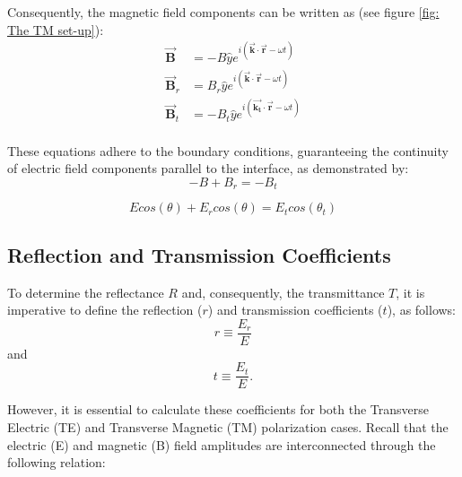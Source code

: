 Consequently, the magnetic field components can be written as (see figure \ref{fig: The TM set-up}):
\begin{align*}
    \vec{\mathbf{B}} &= -B\hat{y} e^{i(\vec{\mathbf{k}} \cdot \vec{\mathbf{r}} - \omega t)} \\
    \vec{\mathbf{B}}_r &= B_r\hat{y} e^{i(\vec{\mathbf{k}} \cdot \vec{\mathbf{r}} - \omega t)} \\
    \vec{\mathbf{B}}_t &= -B_t\hat{y} e^{i(\vec{\mathbf{k_t}} \cdot \vec{\mathbf{r}} - \omega t)} \\
\end{align*}

These equations adhere to the boundary conditions, guaranteeing the continuity of electric field components parallel to the interface, as demonstrated by:
\begin{equation} \label{Magnetic field boundary conditions for TM waves}
-B + B_r = -B_t
\end{equation}

\begin{equation} \label{Electric field boundary conditions for TM waves}
Ecos(\theta) + E_rcos(\theta) = E_tcos(\theta_t)
\end{equation}

\subsection{Reflection and Transmission Coefficients}
To determine the reflectance $R$ and, consequently, the transmittance $T$, it is imperative to define the reflection ($r$) and transmission coefficients ($t$), as follows:
\begin{equation} \label{Definition of the reflection coefficient}
r \equiv \frac{E_r}{E}
\end{equation}
and
\begin{equation} \label{Definition of the transmission coefficient}
t \equiv \frac{E_t}{E}.
\end{equation}

However, it is essential to calculate these coefficients for both the Transverse Electric (TE) and Transverse Magnetic (TM) polarization cases. Recall that the electric (E) and magnetic (B) field amplitudes are interconnected through the following relation:

